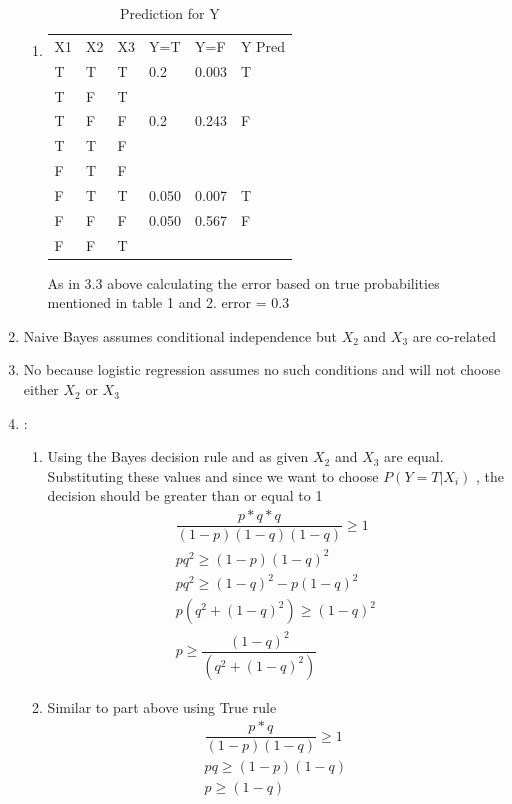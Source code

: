 \begin{enumerate}
\begin{enumerate}
  \item
\begin{table}[H]
\centering
\caption{Prediction for Y}
\label{my-label}
\begin{tabular}{llllll}
X1 & X2 & X3 & Y=T   & Y=F   & Y Pred \\
T  & T  & T  & 0.2   & 0.003 & T      \\
T  & F  & T  &       &       &        \\
T  & F  & F  & 0.2   & 0.243 & F      \\
T  & T  & F  &       &       &        \\
F  & T  & F  &       &       &        \\
F  & T  & T  & 0.050 & 0.007 & T      \\
F  & F  & F  & 0.050 & 0.567 & F      \\
F  & F  & T  &       &       &       
\end{tabular}
\end{table}
 As in 3.3 above calculating the error based on true probabilities mentioned in table 1 and 2.
	error = 0.3
    
  \end{enumerate}

\item Naive Bayes assumes conditional independence but $X_2$ and $X_3$ are co-related


\item No because logistic regression assumes no such conditions and will not choose either $X_2$ or $X_3$

\item :

  \begin{enumerate}
    \item Using the Bayes decision rule and as given $X_2$ and $X_3$ are equal. Substituting these values and since we want to choose $P(Y = T | X_i)$ , the decision should be greater than or equal to 1 \\
	\begin{align*}
		\dfrac{ p * q * q}{(1-p) (1-q) (1-q)} \ge 1 \\
		pq^2 \ge (1-p) (1-q)^2 \\
		pq^2 \ge (1-q)^2 - p(1-q)^2 \\
		p(q^2 + (1-q)^2) \ge (1-q)^2 \\
		p \ge \dfrac{(1-q)^2}{(q^2 + (1-q)^2)}
	\end{align*}



    \item Similar to part above using True rule 
	\begin{align*}
	\dfrac{ p * q }{(1-p) (1-q)} \ge 1 \\
	pq \ge (1-p) (1-q) \\
	p \ge (1-q)\\
	\end{align*}



\end{enumerate}
\end{enumerate}
